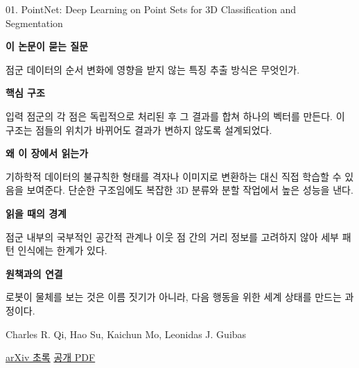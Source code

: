 \documentclass[11pt,openany]{book}
\begin{document}
\begin{termcard}{01. PointNet: Deep Learning on Point Sets for 3D Classification and Segmentation}

\par

\medskip

{\sffamily\bfseries\color{deepblue} 이 논문이 묻는 질문}\par

점군 데이터의 순서 변화에 영향을 받지 않는 특징 추출 방식은 무엇인가.

\smallskip

{\sffamily\bfseries\color{deepblue} 핵심 구조}\par

입력 점군의 각 점은 독립적으로 처리된 후 그 결과를 합쳐 하나의 벡터를 만든다. 이 구조는 점들의 위치가 바뀌어도 결과가 변하지 않도록 설계되었다.

\smallskip

{\sffamily\bfseries\color{deepblue} 왜 이 장에서 읽는가}\par

기하학적 데이터의 불규칙한 형태를 격자나 이미지로 변환하는 대신 직접 학습할 수 있음을 보여준다. 단순한 구조임에도 복잡한 3D 분류와 분할 작업에서 높은 성능을 낸다.

\smallskip

{\sffamily\bfseries\color{coral} 읽을 때의 경계}\par

점군 내부의 국부적인 공간적 관계나 이웃 점 간의 거리 정보를 고려하지 않아 세부 패턴 인식에는 한계가 있다.

\smallskip

{\sffamily\bfseries\color{teal} 원책과의 연결}\par

로봇이 물체를 보는 것은 이름 짓기가 아니라, 다음 행동을 위한 세계 상태를 만드는 과정이다.

\medskip

{\footnotesize\color{muted} Charles R. Qi, Hao Su, Kaichun Mo, Leonidas J. Guibas\par

\href{https://arxiv.org/abs/1612.00593}{arXiv 초록} \quad \href{https://arxiv.org/pdf/1612.00593}{공개 PDF}\par}

\end{termcard}
\end{document}
